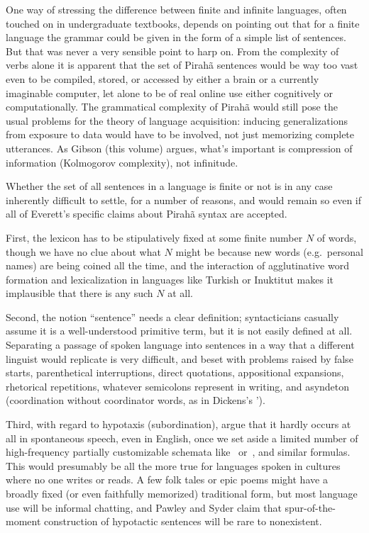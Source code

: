 \documentclass[output=paper,colorlinks,citecolor=brown
]{langscibook}
\begin{document}
One way of stressing the difference between finite and infinite languages,
often touched on in undergraduate textbooks, depends on pointing out that
for a finite language the grammar could be given in the form of a simple
list of sentences. But that was never a very sensible point to harp on.
From the complexity of verbs alone \citep[288--301]{Everett86HAL}
it is apparent that the set of Pirah{\~a} sentences would be way too vast
even to be compiled, stored, or accessed by either a brain or a currently
imaginable computer, let alone to be of real online use either cognitively
or computationally. The grammatical complexity of Pirah{\~a} would still
pose the usual problems for the theory of language acquisition: inducing
generalizations from exposure to data would have to be involved, not just
memorizing complete utterances. As Gibson (this volume) argues, what's
important is compression of information (Kolmogorov complexity), not
infinitude.

Whether the set of all sentences in a language is finite or not is
in any case inherently difficult to settle, for a number of reasons,
and would remain so even if all of Everett's specific claims about
Pirah{\~a} syntax are accepted.

First, the lexicon has to be stipulatively fixed at some finite number
$N$ of words, though we have no clue about what $N$ might be because
new words (e.g.\ personal names) are being coined all the time, and
the interaction of agglutinative word formation and lexicalization
in languages like Turkish or Inuktitut makes it implausible that there
is any such $N$ at all.

Second, the notion ``sentence'' needs a clear definition; syntacticians
casually assume it is a well-understood primitive term, but it is not
easily defined at all. Separating a passage of spoken language into
sentences in a way that a different linguist would replicate is very
difficult, and beset with problems raised by false starts,
parenthetical interruptions, direct quotations, appositional
expansions, rhetorical repetitions, whatever semicolons represent in
writing, and asyndeton (coordination without coordinator words, as
in Dickens's ').

Third, with regard to hypotaxis (subordination), \citet{PawlSyde00}
argue that it hardly occurs at all in spontaneous speech, even in
English, once we set aside a limited number of high-frequency partially
customizable schemata like \, or \,, and similar formulas. This would presumably be all
the more true for languages spoken in cultures where no one writes
or reads. A few folk tales or epic poems might have a broadly fixed
(or even faithfully memorized) traditional form, but most language
use will be informal chatting, and Pawley and Syder claim that
spur-of-the-moment construction of hypotactic sentences will be rare
to nonexistent.
\end{document}
